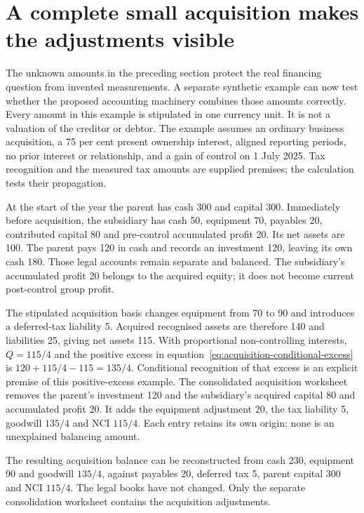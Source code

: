 \section{A complete small acquisition makes the adjustments visible}
\label{sim:acquisition-worked}

The unknown amounts in the preceding section protect the real financing question from invented measurements. A separate synthetic example can now test whether the proposed accounting machinery combines those amounts correctly. Every amount in this example is stipulated in one currency unit. It is not a valuation of the creditor or debtor. The example assumes an ordinary business acquisition, a 75 per cent present ownership interest, aligned reporting periods, no prior interest or relationship, and a gain of control on 1 July 2025. Tax recognition and the measured tax amounts are supplied premises; the calculation tests their propagation.

At the start of the year the parent has cash 300 and capital 300. Immediately before acquisition, the subsidiary has cash 50, equipment 70, payables 20, contributed capital 80 and pre-control accumulated profit 20. Its net assets are 100. The parent pays 120 in cash and records an investment 120, leaving its own cash 180. Those legal accounts remain separate and balanced. The subsidiary's accumulated profit 20 belongs to the acquired equity; it does not become current post-control group profit.

The stipulated acquisition basis changes equipment from 70 to 90 and introduces a deferred-tax liability 5. Acquired recognised assets are therefore 140 and liabilities 25, giving net assets 115. With proportional non-controlling interests, $Q=115/4$ and the positive excess in equation~\eqref{eq:acquisition-conditional-excess} is $120+115/4-115=135/4$. Conditional recognition of that excess is an explicit premise of this positive-excess example. The consolidated acquisition worksheet removes the parent's investment 120 and the subsidiary's acquired capital 80 and accumulated profit 20. It adds the equipment adjustment 20, the tax liability 5, goodwill $135/4$ and NCI $115/4$. Each entry retains its own origin; none is an unexplained balancing amount.

The resulting acquisition balance can be reconstructed from cash 230, equipment 90 and goodwill $135/4$, against payables 20, deferred tax 5, parent capital 300 and NCI $115/4$. The legal books have not changed. Only the separate consolidation worksheet contains the acquisition adjustments.

